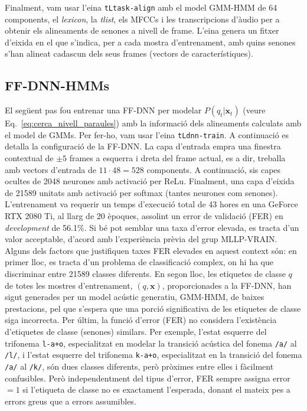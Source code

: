 

Finalment, vam usar l'eina \texttt{tLtask-align} amb el model GMM-HMM de 64 components, el \textit{lexicon}, la \textit{tlist}, els MFCCs i les transcripcions d'àudio per a obtenir els alineaments de senones a nivell de frame.
L'eina genera un fitxer d'eixida en el que s'indica, per a cada mostra d'entrenament, amb quins senones s'han alineat cadascun dels seus frames (vectors de característiques).




\subsection{FF-DNN-HMMs}
\label{cap05_am_dnn}

El següent pas fou entrenar una FF-DNN per modelar $P(q_t|\textbf{x}_t)$ (veure Eq.~\ref{eq:cerca_nivell_paraules}) amb la informació dels alineaments calculats amb el model de GMMs. Per fer-ho, vam usar l'eina \texttt{tLdnn-train}. A continuació es detalla la configuració de la FF-DNN.
La capa d'entrada empra una finestra contextual de $\pm 5$ frames a esquerra i dreta del frame actual, es a dir, treballa amb vectors d'entrada de $11 \cdot 48 = 528$ components.
A continuació, sis capes ocultes de 2048 neurones amb activació per ReLu. Finalment, una capa d'eixida de 21589 unitats amb activació per softmax (tantes neurones com senones).
L'entrenament va requerir un temps d'execució total de 43 hores en una GeForce RTX 2080 Ti, al llarg de 20 èpoques, assolint un error de validació (FER) en \textit{development} de 56.1\%.
Si bé pot semblar una taxa d'error elevada, es tracta d'un valor acceptable, d'acord amb l'experiència  prèvia del grup MLLP-VRAIN. Alguns dels factors que justifiquen taxes FER elevades en aquest context són: en primer lloc, es tracta d'un problema de classificació complex, on hi ha que discriminar entre 21589 classes diferents. En segon lloc, les etiquetes de classe $q$ de totes les mostres d'entrenament, $(q, \textbf{x})$, proporcionades a la FF-DNN, han sigut generades per un model acústic generatiu, GMM-HMM, de baixes prestacions, pel que s'espera que una porció significativa de les etiquetes de classe siga incorrecta. Per últim, la funció d'error (FER) no considera l'existència d'etiquetes de classe (senones) similars. Per exemple, l'estat esquerre del trifonema \verb|l-a+o|, especialitzat en modelar la transició acústica del fonema \verb|/a/| al \verb|/l/|, i l'estat esquerre del trifonema \verb|k-a+o|, especialitzat en la transició del fonema \verb|/a/| al \verb|/k/|, són dues classes diferents, però pròximes entre elles i fàcilment confusibles. Però independentment del tipus d'error, FER sempre assigna error $= 1$ si l'etiqueta de classe no es exactament l'esperada, donant el mateix pes a errors greus que a errors assumibles.

